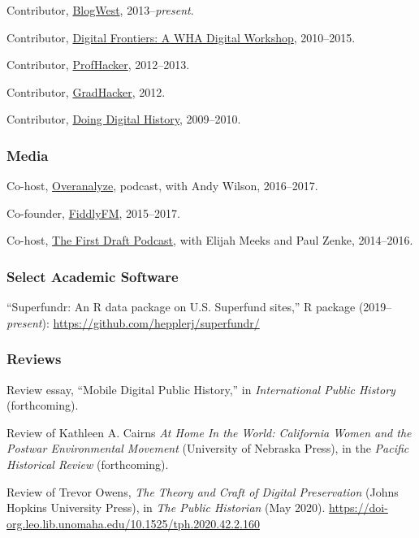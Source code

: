 Contributor, \href{http://blogwest.org/}{BlogWest},
2013--\emph{present}.

Contributor, \href{http://whadigitalfrontiers.com/}{Digital Frontiers: A
WHA Digital Workshop}, 2010--2015.

Contributor, \href{http://chronicle.com/blogs/profhacker/}{ProfHacker},
2012--2013.

Contributor,
\href{https://www.insidehighered.com/blogs/gradhacker}{GradHacker},
2012.

Contributor, \href{http://digitalhistory.unl.edu/}{Doing Digital
History}, 2009--2010.

\subsubsection{Media}\label{media}

Co-host, \href{http://overanalyze.fireside.fm}{Overanalyze}, podcast,
with Andy Wilson, 2016--2017.

Co-founder, \href{http://fiddly.fm}{FiddlyFM}, 2015--2017.

Co-host, \href{http://www.fiddly.fm/firstdraft/}{The First Draft
Podcast}, with Elijah Meeks and Paul Zenke, 2014--2016.

\subsubsection{Select Academic Software}\label{select-academic-software}

``Superfundr: An R data package on U.S. Superfund sites,'' R package
(2019--\emph{present}): \url{https://github.com/hepplerj/superfundr/}

\subsubsection{Reviews}\label{reviews}

Review essay, ``Mobile Digital Public History,'' in \emph{International
Public History} (forthcoming).

Review of Kathleen A. Cairns \emph{At Home In the World: California
Women and the Postwar Environmental Movement} (University of Nebraska
Press), in the \emph{Pacific Historical Review} (forthcoming).

Review of Trevor Owens, \emph{The Theory and Craft of Digital
Preservation} (Johns Hopkins University Press), in \emph{The Public
Historian} (May 2020).
\url{https://doi-org.leo.lib.unomaha.edu/10.1525/tph.2020.42.2.160}


